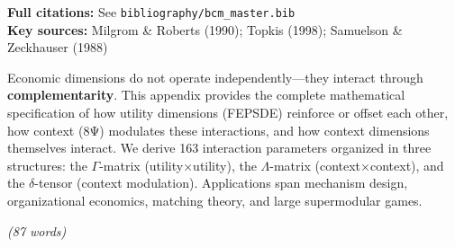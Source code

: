 \noindent\textbf{Full citations:} See \texttt{bibliography/bcm\_master.bib} \\
\textbf{Key sources:} Milgrom \& Roberts (1990); Topkis (1998); Samuelson \& Zeckhauser (1988)

\vspace{1em}


\begin{tcolorbox}[colback=white, colframe=black,
    title=\textbf{Abstract}]

Economic dimensions do not operate independently---they interact through 
\textbf{complementarity}. This appendix provides the complete mathematical 
specification of how utility dimensions (FEPSDE) reinforce or offset each other, 
how context (8Ψ) modulates these interactions, and how context dimensions 
themselves interact. We derive 163 interaction parameters organized in three 
structures: the $\Gamma$-matrix (utility$\times$utility), the $\Lambda$-matrix 
(context$\times$context), and the $\delta$-tensor (context modulation). 
Applications span mechanism design, organizational economics, matching theory, 
and large supermodular games.

\textit{(87 words)}

\end{tcolorbox}


